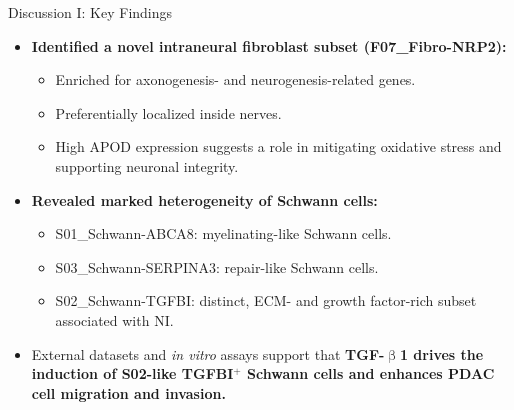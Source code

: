 \documentclass[10pt]{beamer}
\theoremstyle{plain}
\begin{document}
\begin{frame}{Discussion I: Key Findings}
  \begin{itemize}
    \item \textbf{Identified a novel intraneural fibroblast subset (F07\_Fibro-NRP2):}
      \begin{itemize}
        \item Enriched for axonogenesis- and neurogenesis-related genes.
        \item Preferentially localized inside nerves.
        \item High APOD expression suggests a role in mitigating oxidative stress and supporting neuronal integrity.
      \end{itemize}
    \item \textbf{Revealed marked heterogeneity of Schwann cells:}
      \begin{itemize}
        \item S01\_Schwann-ABCA8: myelinating-like Schwann cells.
        \item S03\_Schwann-SERPINA3: repair-like Schwann cells.
        \item S02\_Schwann-TGFBI: distinct, ECM- and growth factor-rich subset associated with NI.
      \end{itemize}
    \item External datasets and \textit{in vitro} assays support that \textbf{TGF-\(\upbeta\)1 drives the induction of S02-like TGFBI\(^+\) Schwann cells and enhances PDAC cell migration and invasion.}
  \end{itemize}
\end{frame}
\end{document}
